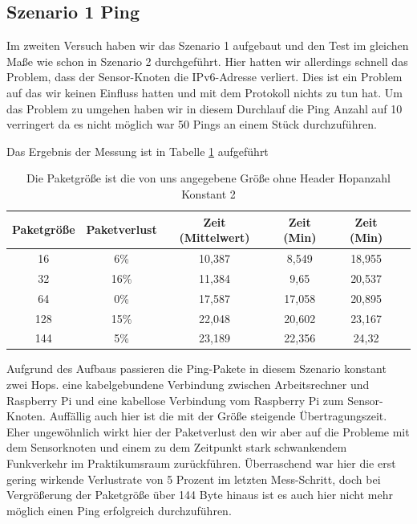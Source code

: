 \documentclass[]{scrartcl}
\begin{document}
\subsection{Szenario 1 Ping}

Im zweiten Versuch haben wir das Szenario 1 aufgebaut und den Test im gleichen Maße wie schon in Szenario 2 durchgeführt. Hier hatten wir allerdings schnell das Problem, dass der Sensor-Knoten die IPv6-Adresse verliert. Dies ist ein Problem auf das wir keinen Einfluss hatten und mit dem Protokoll nichts zu tun hat. Um das Problem zu umgehen haben wir in diesem Durchlauf die Ping Anzahl auf 10 verringert da es nicht möglich war 50 Pings an einem Stück durchzuführen.

Das Ergebnis der Messung ist in Tabelle \ref{table_ping_result_scenario1} aufgeführt

\begin{table}[H]
\centering
\begin{tabular}{|c|c|c|c|c|c|}
  \hline
  \textbf{Paketgröße} & \textbf{Paketverlust} & \textbf{Zeit (Mittelwert)} & \textbf{Zeit (Min)} & \textbf{Zeit (Min)} \\
  \hline
   16 & 6\% & 10,387 & 8,549 & 18,955\\
  \hline
   32 & 16\% & 11,384 & 9,65 & 20,537\\
  \hline
   64 & 0\% & 17,587 & 17,058 & 20,895\\
  \hline
   128 & 15\% & 22,048 & 20,602 & 23,167\\
  \hline
   144 & 5\% & 23,189 & 22,356 & 24,32\\
  \hline
\end{tabular}
	\caption{Die Paketgröße ist die von uns angegebene Größe ohne Header Hopanzahl Konstant 2}
	\label{table_ping_result_scenario1}
\end{table}

Aufgrund des Aufbaus passieren die Ping-Pakete in diesem Szenario konstant zwei Hops. eine kabelgebundene Verbindung zwischen Arbeitsrechner und Raspberry Pi und eine kabellose Verbindung vom Raspberry Pi zum Sensor-Knoten. Auffällig auch hier ist die mit der Größe steigende Übertragungszeit. Eher ungewöhnlich wirkt hier der Paketverlust den wir aber auf die Probleme mit dem Sensorknoten und einem zu dem Zeitpunkt stark schwankendem Funkverkehr im Praktikumsraum zurückführen. Überraschend war hier die erst gering wirkende Verlustrate von 5 Prozent im letzten Mess-Schritt, doch bei Vergrößerung der Paketgröße über 144 Byte hinaus ist es auch hier nicht mehr möglich einen Ping erfolgreich durchzuführen.
\end{document}
